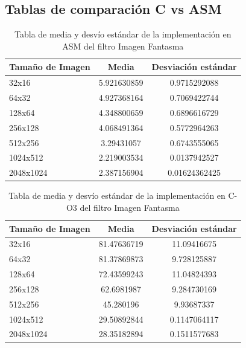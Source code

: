 \documentclass[a4paper]{article}
\begin{document}
\subsection{Tablas de comparación C vs ASM}
\begin{table}[h!]
	\begin{center}
		\begin{tabular}{| l | c | c |}
			\hline
			Tamaño de Imagen & Media & Desviación estándar \\ \hline
			32x16	 & 5.921630859 &	0.9715292088 \\
			64x32	 & 4.927368164 & 0.7069422744 \\
			128x64	 & 4.348800659 & 0.6896616729 \\
			256x128	 & 4.068491364	& 0.5772964263 \\
			512x256	 & 3.29431057	& 0.6743555065 \\
			1024x512 & 2.219003534	& 0.0137942527 \\
			2048x1024 &	2.387156904	& 0.01624362425 \\ \hline
		\end{tabular}
		\caption{Tabla de media y desvío estándar de la implementación en ASM del filtro Imagen Fantasma}
	\end{center}
\end{table}

\begin{table}[h!]
	\begin{center}
		\begin{tabular}{| l | c | c |}
			\hline
			Tamaño de Imagen & Media & Desviación estándar \\ \hline
			32x16	& 81.47636719	& 11.09416675 \\
			64x32	& 81.37869873	& 9.728125887 \\
			128x64	& 72.43599243	& 11.04824393 \\
			256x128	& 62.6981987	& 9.284730169 \\
			512x256	& 45.280196	& 9.93687337 \\
			1024x512 & 29.50892844	& 0.1147064117 \\
			2048x1024 & 28.35182894	& 0.1511577683 \\ \hline
		\end{tabular}
		\caption{Tabla de media y desvío estándar de la implementación en C-O3 del filtro Imagen Fantasma}
	\end{center}
\end{table}
\end{document}
